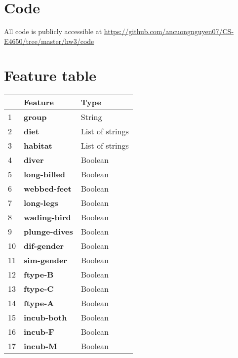 \section{Code}
All code is publicly accessible at \url{https://github.com/ancuongnguyen07/CS-E4650/tree/master/hw3/code}


\section{Feature table}
\begin{table}[ht]
    \centering
    \begin{tabular}{|p{1cm}|p{4cm}|p{4cm}|}
        \hline
         & Feature & Type \\
        \hline
        1 & \textbf{group}        &       String \\
        \hline
        2 & \textbf{diet}          &      List of strings \\
        \hline
        3 & \textbf{habitat}        &     List of strings \\
        \hline
        4 & \textbf{diver}             & Boolean   \\
        \hline
        5 & \textbf{long-billed}       & Boolean   \\
        \hline
        6 & \textbf{webbed-feet}         & Boolean   \\
        \hline
        7 & \textbf{long-legs}          & Boolean   \\
        \hline
        8 & \textbf{wading-bird}        & Boolean   \\
        \hline
        9 & \textbf{plunge-dives}        & Boolean   \\
        \hline
        10 & \textbf{dif-gender}         & Boolean   \\
        \hline
        11 & \textbf{sim-gender}          & Boolean   \\
        \hline
        12 & \textbf{ftype-B}             & Boolean   \\
        \hline
        13 & \textbf{ftype-C}            & Boolean   \\
        \hline
        14 & \textbf{ftype-A}            & Boolean   \\
        \hline
        15 & \textbf{incub-both}          & Boolean   \\
        \hline
        16 & \textbf{incub-F}             & Boolean   \\
        \hline
        17 & \textbf{incub-M}             & Boolean   \\

\end{tabular}
\end{table}
